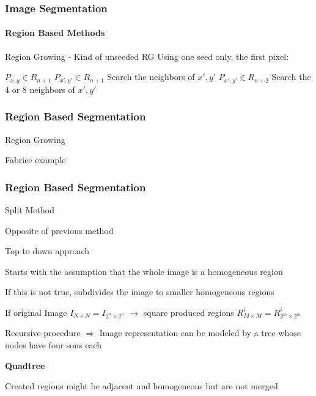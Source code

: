 \documentclass{beamer}
\begin{document}
\begin{frame}
\frametitle{Image Segmentation}
\framesubtitle{Region Based Methods}
\begin{block}{Region Growing - Kind of unseeded RG}
Using one seed only, the first pixel: \\
\scriptsize{
\begin{algorithmic}
 	\State $P_{x,y} \in R_{n+1}$
 				\State $P_{x',y'} \in R_{n+1}$
 				\State Search the neighbors of $x',y'$ 
 			\Else
 				\State $P_{x',y'} \in R_{n+2}$
 				\State Search the 4 or 8 neighbors of $x',y'$
 			\EndIf
 		\EndIf
 	\EndFor
 \EndIf
 \EndFor
 \end{algorithmic}
}
\end{block}
\end{frame}

\begin{frame}
\frametitle{Region Based Segmentation}
\begin{block}{Region Growing}
\end{block}
{\color{red} Fabrice example}
\end{frame}

\begin{frame}
\frametitle{Region Based Segmentation}
\begin{block}{Split Method}
\begin{itemize}
\footnotesize{
\item Opposite of previous method 
\item Top to down approach
\item Starts with the assumption that the whole image is a homogeneous region
\item If this is not true, subdivides the image to smaller homogeneous regions 
\item If original Image $I_{N \times N} = I_{2^n \times 2^n}$ $\rightarrow$ square produced regions $R^{i}_{M \times M} = R^{i}_{2^m \times 2^m}$ 
\item Recursive procedure $\Rightarrow$ Image representation can be modeled by a tree whose nodes have four sons each
\item \textbf{Quadtree} 
\item {\color{red} Created regions might be adjacent and homogeneous but are not merged}}
\end{itemize}
\end{block}
\end{frame}
\end{document}
